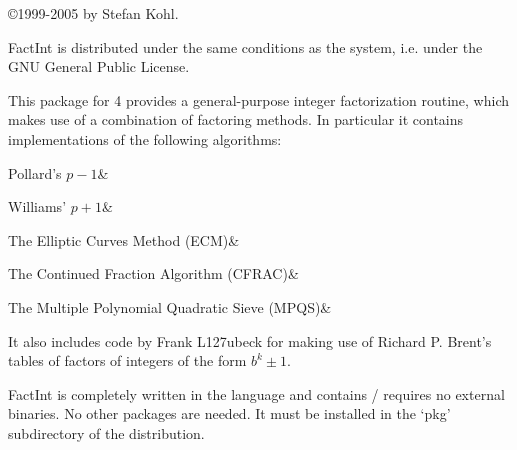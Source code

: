 
\copyright 1999-2005 by Stefan Kohl.

{\sf FactInt} is distributed under the same conditions as the {\GAP}
system, i.e. under the GNU General Public License.

This package for {\GAP} 4 provides a general-purpose integer
factorization routine, which makes use of a combination of factoring
methods. In particular it contains implementations of the following
algorithms:

\beginitems
Pollard's $p-1$&

Williams' $p+1$&

The Elliptic Curves Method (ECM)&

The Continued Fraction Algorithm (CFRAC)&

The Multiple Polynomial Quadratic Sieve (MPQS)&
\enditems

It also includes code by Frank L\accent127ubeck for making use of
Richard P. Brent's tables of factors of integers of the form $b^k \pm 1$.

{\sf FactInt} is completely written in the {\GAP} language and contains /
requires no external binaries. No other packages are needed.
It must be installed in the `pkg' subdirectory of the
{\GAP} distribution.

